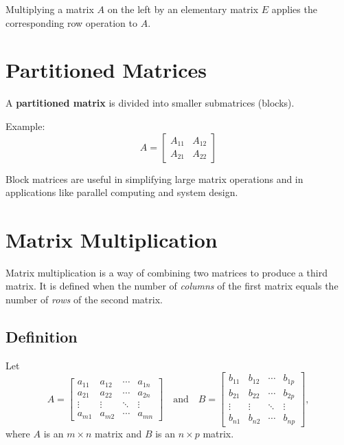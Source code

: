 \documentclass[12pt]{article}
\begin{document}
	Multiplying a matrix \( A \) on the left by an elementary matrix \( E \) applies the corresponding row operation to \( A \).
	
	\section{Partitioned Matrices}
	A \textbf{partitioned matrix} is divided into smaller submatrices (blocks).
	
	Example:
	\[
	A = \begin{bmatrix}
		A_{11} & A_{12} \\
		A_{21} & A_{22}
	\end{bmatrix}
	\]
	
	Block matrices are useful in simplifying large matrix operations and in applications like parallel computing and system design.
	
	\newpage
	
	\section*{Matrix Multiplication}
	
	Matrix multiplication is a way of combining two matrices to produce a third matrix. 
	It is defined when the number of \emph{columns} of the first matrix equals the number of \emph{rows} of the second matrix.
	
	\subsection*{Definition}
	
	Let
	\[
	A =
	\begin{bmatrix}
		a_{11} & a_{12} & \cdots & a_{1n} \\
		a_{21} & a_{22} & \cdots & a_{2n} \\
		\vdots & \vdots & \ddots & \vdots \\
		a_{m1} & a_{m2} & \cdots & a_{mn}
	\end{bmatrix}
	\quad \text{and} \quad
	B =
	\begin{bmatrix}
		b_{11} & b_{12} & \cdots & b_{1p} \\
		b_{21} & b_{22} & \cdots & b_{2p} \\
		\vdots & \vdots & \ddots & \vdots \\
		b_{n1} & b_{n2} & \cdots & b_{np}
	\end{bmatrix},
	\]
	where $A$ is an $m\times n$ matrix and $B$ is an $n\times p$ matrix.
	
\end{document}
